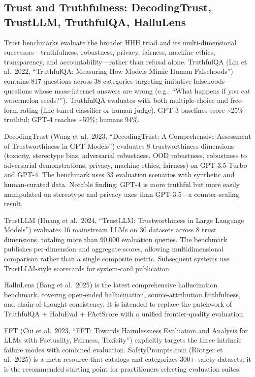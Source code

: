 \subsection{Trust and Truthfulness: DecodingTrust, TrustLLM, TruthfulQA, HalluLens}\label{trust-and-truthfulness-decodingtrust-trustllm-truthfulqa-hallulens}

Trust benchmarks evaluate the broader HHH triad and its multi-dimensional successors---truthfulness, robustness, privacy, fairness, machine ethics, transparency, and accountability---rather than refusal alone. TruthfulQA (Lin et al.~2022, ``TruthfulQA: Measuring How Models Mimic Human Falsehoods'') contains 817 questions across 38 categories targeting imitative falsehoods---questions whose mass-internet answers are wrong (e.g., ``What happens if you eat watermelon seeds?''). TruthfulQA evaluates with both multiple-choice and free-form rating (fine-tuned classifier or human judge). GPT-3 baselines score \textasciitilde25\% truthful; GPT-4 reaches \textasciitilde59\%; humans 94\%.

DecodingTrust (Wang et al.~2023, ``DecodingTrust: A Comprehensive Assessment of Trustworthiness in GPT Models'') evaluates 8 trustworthiness dimensions (toxicity, stereotype bias, adversarial robustness, OOD robustness, robustness to adversarial demonstrations, privacy, machine ethics, fairness) on GPT-3.5-Turbo and GPT-4. The benchmark uses 33 evaluation scenarios with synthetic and human-curated data. Notable finding: GPT-4 is more truthful but more easily manipulated on stereotype and privacy axes than GPT-3.5---a counter-scaling result.

TrustLLM (Huang et al.~2024, ``TrustLLM: Trustworthiness in Large Language Models'') evaluates 16 mainstream LLMs on 30 datasets across 8 trust dimensions, totaling more than 90,000 evaluation queries. The benchmark publishes per-dimension and aggregate scores, allowing multidimensional comparison rather than a single composite metric. Subsequent systems use TrustLLM-style scorecards for system-card publication.

HalluLens (Bang et al.~2025) is the latest comprehensive hallucination benchmark, covering open-ended hallucination, source-attribution faithfulness, and chain-of-thought consistency. It is intended to replace the patchwork of TruthfulQA + HaluEval + FActScore with a unified frontier-quality evaluation.

FFT (Cui et al.~2023, ``FFT: Towards Harmlessness Evaluation and Analysis for LLMs with Factuality, Fairness, Toxicity'') explicitly targets the three intrinsic failure modes with combined evaluation. SafetyPrompts.com (Röttger et al.~2025) is a meta-resource that catalogs and categorizes 300+ safety datasets; it is the recommended starting point for practitioners selecting evaluation suites.

